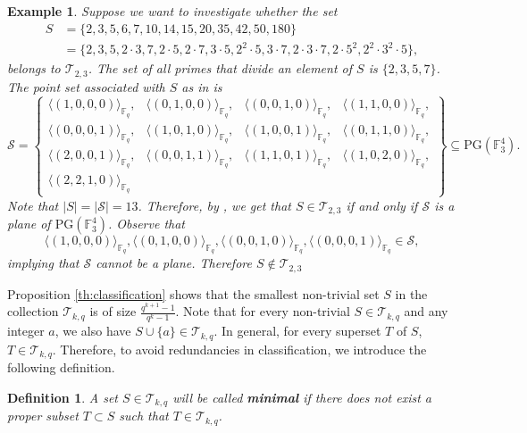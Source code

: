 \documentclass[12pt]{amsart}
\newtheorem{definition}{Definition}
\newtheorem{example}[theorem]{Example}
\newcommand{\F}{{\mathbb F}}
\newcommand{\fq}{{\mathbb F}_{q}}
\newcommand{\PG}{\mathrm{PG}}
\begin{document}
\begin{example} \label{ex:moreprimes}
Suppose we want to investigate whether the set \[
    \begin{array}{rl}
          S& =\{2,3,5,6,
          7,10,14,15,
          20,35,42,50,180\} \\
         & =\{2,3,5,2\cdot 3,7,2 \cdot 5,2\cdot 7, 3 \cdot 5,2^2 \cdot 5, 3 \cdot 7,2 \cdot 3 \cdot 7, 2 \cdot 5^2, 2^2 \cdot 3^2 \cdot 5\},
    \end{array}
   \]
   belongs to $\mathcal{T}_{2,3}$. The set of all primes that divide an element of $S$ is $\{2, 3,5,7\}$. The point set associated with $S$ as in  is 
    \[
\mathcal{S}= \left\{ \begin{array}{cccc}
     \langle (1,0, 0,0) \rangle_{\fq}, & \langle (0,1,0,0)\rangle_{\fq}, &\langle (0, 0,1, 0) \rangle_{\fq}, &
     \langle (1, 1, 0,0) \rangle_{\fq},  \\  
\langle (0,0, 0,1) \rangle_{\fq}, & \langle (1,0,1,0)\rangle_{\fq}, & \langle (1, 0,0, 1) \rangle_{\fq}, &\langle (0, 1, 1,0) \rangle_{\fq},\\
\langle (2,0, 0,1) \rangle_{\fq}, & \langle (0,0,1,1)\rangle_{\fq}, & \langle (1, 1,0, 1) \rangle_{\fq}, &\langle (1, 0,2,0) \rangle_{\fq}, \\
\langle (2, 2,1,0) \rangle_{\fq} &&&
\end{array}\right\} \subseteq \PG(\F_3^4).
\]
Note that $\lvert S \rvert=\lvert \mathcal{S} \rvert = 13$. Therefore, by , we get that $S \in \mathcal{T}_{2,3}$ if and only if $\mathcal{S}$ is a plane of $\PG(\F_3^4)$. Observe that \[
\langle (1,0, 0,0) \rangle_{\fq}, \langle (0,1,0,0)\rangle_{\fq}, \langle (0, 0,1, 0) \rangle_{\fq},  
\langle (0,0, 0,1) \rangle_{\fq} \in \mathcal{S},\] implying that $\mathcal{S}$ cannot be a plane. Therefore $S \notin \mathcal{T}_{2,3}$
\end{example}

Proposition \ref{th:classification} shows that the smallest non-trivial set $S$ in the collection $\mathcal{T}_{k,q}$ is of size $\frac{q^{k+1} - 1}{q^{k} - 1}$. Note that for every non-trivial $S \in \mathcal{T}_{k,q}$ and any integer $a$, we also have $S \cup \{a\} \in\mathcal{T}_{k,q}$. In general, for every superset $T$ of $S$, $T \in\mathcal{T}_{k,q}$. Therefore, to avoid redundancies in classification, we introduce the following definition. 

\begin{definition}
A set $S \in \mathcal{T}_{k,q}$ will be called \textbf{minimal} if there does not exist a  proper subset $T \subset S$ such that $T \in \mathcal{T}_{k,q}$. 
\end{definition}
\end{document}
